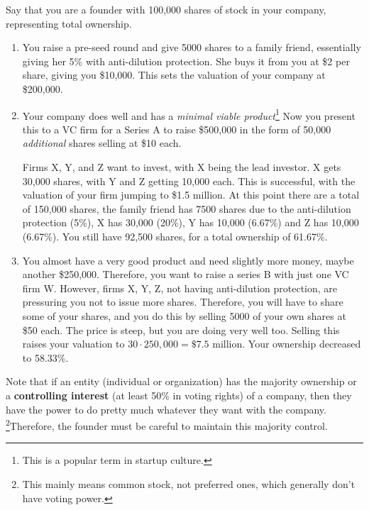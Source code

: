 \documentclass{article}
\begin{document}
    \begin{example}
      Say that you are a founder with 100,000 shares of stock in your company, representing total ownership. 
      \begin{enumerate}
        \item You raise a pre-seed round and give 5000 shares to a family friend, essentially giving her 5\% with anti-dilution protection. She buys it from you at \$2 per share, giving you \$10,000. This sets the valuation of your company at \$200,000. 

        \item Your company does well and has a \textit{minimal viable product}\footnote{This is a popular term in startup culture. } Now you present this to a VC firm for a Series A to raise \$500,000 in the form of 50,000 \textit{additional} shares selling at \$10 each. 

        Firms X, Y, and Z want to invest, with X being the lead investor. X gets 30,000 shares, with Y and Z getting 10,000 each. This is successful, with the valuation of your firm jumping to \$1.5 million. At this point there are a total of 150,000 shares, the family friend has 7500 shares due to the anti-dilution protection (5\%), X has 30,000 (20\%), Y has 10,000 (6.67\%) and Z has 10,000 (6.67\%). You still have 92,500 shares, for a total ownership of 61.67\%. 

        \item You almost have a very good product and need slightly more money, maybe another \$250,000. Therefore, you want to raise a series B with just one VC firm W. However, firms X, Y, Z, not having anti-dilution protection, are pressuring you not to issue more shares. Therefore, you will have to share some of your shares, and you do this by selling 5000 of your own shares at \$50 each. The price is steep, but you are doing very well too. Selling this raises your valuation to $30 \cdot 250,000 = \$7.5$ million. Your ownership decreased to 58.33\%. 
      \end{enumerate}
    \end{example}

    \begin{definition}
      Note that if an entity (individual or organization) has the majority ownership or a \textbf{controlling interest} (at least 50\% in voting rights) of a company, then they have the power to do pretty much whatever they want with the company.
      \footnote{This mainly means common stock, not preferred ones, which generally don't have voting power. }Therefore, the founder must be careful to maintain this majority control. 
    \end{definition}
\end{document}
